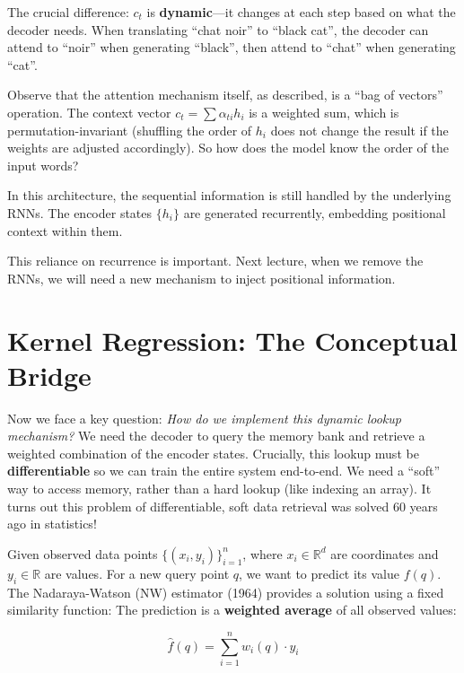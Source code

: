 \documentclass{article}
\begin{document}
The crucial difference: $c_t$ is \textbf{dynamic}---it changes at each step based on what the decoder needs. When translating ``chat noir'' to ``black cat'', the decoder can attend to ``noir'' when generating ``black'', then attend to ``chat'' when generating ``cat''.

\begin{tcolorbox}[colback=gray!5!white, colframe=black!50!black, title=A Note on Sequence Order]
Observe that the attention mechanism itself, as described, is a ``bag of vectors'' operation. The context vector $c_t = \sum \alpha_{ti} h_i$ is a weighted sum, which is permutation-invariant (shuffling the order of $h_i$ does not change the result if the weights are adjusted accordingly). So how does the model know the order of the input words?

In this architecture, the sequential information is still handled by the underlying RNNs. The encoder states $\{h_i\}$ are generated recurrently, embedding positional context within them.

This reliance on recurrence is important. Next lecture, when we remove the RNNs, we will need a new mechanism to inject positional information.
\end{tcolorbox}

\section{Kernel Regression: The Conceptual Bridge}

Now we face a key question: \textit{How do we implement this dynamic lookup mechanism?} We need the decoder to query the memory bank and retrieve a weighted combination of the encoder states. Crucially, this lookup must be \textbf{differentiable} so we can train the entire system end-to-end. We need a ``soft'' way to access memory, rather than a hard lookup (like indexing an array).
It turns out this problem of differentiable, soft data retrieval was solved 60 years ago in statistics!

Given observed data points $\{(x_i, y_i)\}_{i=1}^n$, where $x_i \in \mathbb{R}^d$ are coordinates and $y_i \in \mathbb{R}$ are values. For a new query point $q$, we want to predict its value $f(q)$.
The Nadaraya-Watson (NW) estimator (1964) provides a solution using a fixed similarity function:
The prediction is a \textbf{weighted average} of all observed values:

\begin{equation}
\hat{f}(q) = \sum_{i=1}^{n} w_i(q) \cdot y_i
\end{equation}
\end{document}
